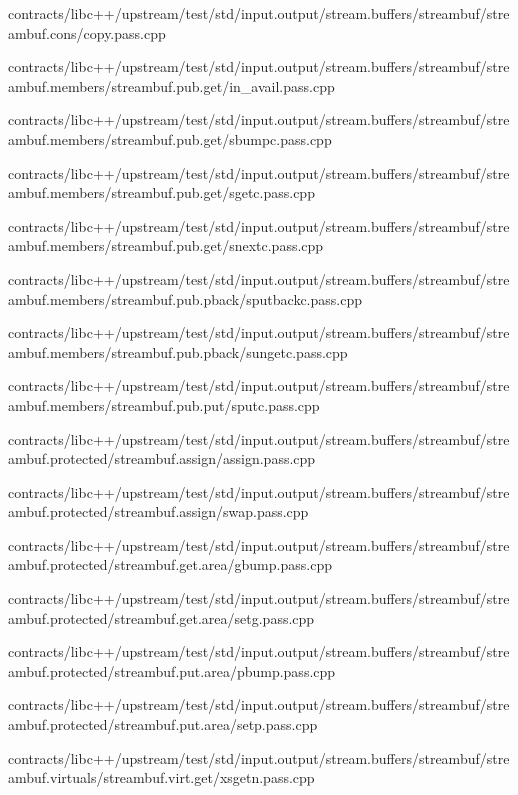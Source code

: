 \begin{DoxyCompactItemize}
contracts/libc++/upstream/test/std/input.\+output/stream.\+buffers/streambuf/streambuf.\+cons/copy.\+pass.\+cpp\item 
contracts/libc++/upstream/test/std/input.\+output/stream.\+buffers/streambuf/streambuf.\+members/streambuf.\+pub.\+get/in\+\_\+avail.\+pass.\+cpp\item 
contracts/libc++/upstream/test/std/input.\+output/stream.\+buffers/streambuf/streambuf.\+members/streambuf.\+pub.\+get/sbumpc.\+pass.\+cpp\item 
contracts/libc++/upstream/test/std/input.\+output/stream.\+buffers/streambuf/streambuf.\+members/streambuf.\+pub.\+get/sgetc.\+pass.\+cpp\item 
contracts/libc++/upstream/test/std/input.\+output/stream.\+buffers/streambuf/streambuf.\+members/streambuf.\+pub.\+get/snextc.\+pass.\+cpp\item 
contracts/libc++/upstream/test/std/input.\+output/stream.\+buffers/streambuf/streambuf.\+members/streambuf.\+pub.\+pback/sputbackc.\+pass.\+cpp\item 
contracts/libc++/upstream/test/std/input.\+output/stream.\+buffers/streambuf/streambuf.\+members/streambuf.\+pub.\+pback/sungetc.\+pass.\+cpp\item 
contracts/libc++/upstream/test/std/input.\+output/stream.\+buffers/streambuf/streambuf.\+members/streambuf.\+pub.\+put/sputc.\+pass.\+cpp\item 
contracts/libc++/upstream/test/std/input.\+output/stream.\+buffers/streambuf/streambuf.\+protected/streambuf.\+assign/assign.\+pass.\+cpp\item 
contracts/libc++/upstream/test/std/input.\+output/stream.\+buffers/streambuf/streambuf.\+protected/streambuf.\+assign/swap.\+pass.\+cpp\item 
contracts/libc++/upstream/test/std/input.\+output/stream.\+buffers/streambuf/streambuf.\+protected/streambuf.\+get.\+area/gbump.\+pass.\+cpp\item 
contracts/libc++/upstream/test/std/input.\+output/stream.\+buffers/streambuf/streambuf.\+protected/streambuf.\+get.\+area/setg.\+pass.\+cpp\item 
contracts/libc++/upstream/test/std/input.\+output/stream.\+buffers/streambuf/streambuf.\+protected/streambuf.\+put.\+area/pbump.\+pass.\+cpp\item 
contracts/libc++/upstream/test/std/input.\+output/stream.\+buffers/streambuf/streambuf.\+protected/streambuf.\+put.\+area/setp.\+pass.\+cpp\item 
contracts/libc++/upstream/test/std/input.\+output/stream.\+buffers/streambuf/streambuf.\+virtuals/streambuf.\+virt.\+get/xsgetn.\+pass.\+cpp\item 

\end{DoxyCompactItemize}
